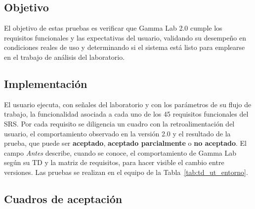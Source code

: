 \documentclass[12pt,letterpaper,oneside]{article}
\DeclareRobustCommand{\_}{\textunderscore\allowbreak}
\begin{document}
\subsection{Objetivo}
El objetivo de estas pruebas es verificar que Gamma Lab 2.0 cumple los requisitos funcionales y las expectativas del usuario, validando su desempeño en condiciones reales de uso y determinando si el sistema está listo para emplearse en el trabajo de análisis del laboratorio.

\subsection{Implementación}
El usuario ejecuta, con señales del laboratorio y con los parámetros de su flujo de trabajo, la funcionalidad asociada a cada uno de los 45 requisitos funcionales del SRS. Por cada requisito se diligencia un cuadro con la retroalimentación del usuario, el comportamiento observado en la versión 2.0 y el resultado de la prueba, que puede ser \textbf{aceptado}, \textbf{aceptado parcialmente} o \textbf{no aceptado}. El campo \textit{Antes} describe, cuando se conoce, el comportamiento de Gamma Lab según su TD \cite{td2025} y la matriz de requisitos, para hacer visible el cambio entre versiones. Las pruebas se realizan en el equipo de la Tabla~\ref{tab:td_ut_entorno}.

\subsection{Cuadros de aceptación}
\end{document}
